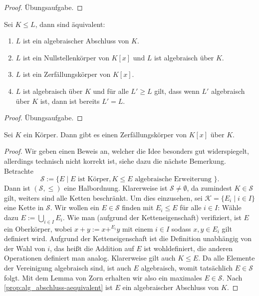 \begin{proof}
    Übungsaufgabe.
\end{proof}

\begin{proposition}\label{prop:alg_abschluss-aequivalent}
    Sei $K \leq L$, dann sind äquivalent:
    \begin{enumerate}
        \item $L$ ist ein algebraischer Abschluss von $K$.
        \item $L$ ist ein Nullstellenkörper von $K[x]$ und $L$ ist algebraisch über $K$.
        \item $L$ ist ein Zerfällungskörper von $K[x]$.
        \item $L$ ist algebraisch über $K$ und für alle $L' \geq L$ gilt, dass wenn $L'$ algebraisch über $K$ ist, dann ist bereits $L' = L$.
    \end{enumerate}
\end{proposition}

\begin{proof}
    Übungsaufgabe.
\end{proof}

\begin{proposition}\label{prop:alg_abschluss}
    Sei $K$ ein Körper. Dann gibt es einen Zerfällungskörper von $K[x]$ über $K$.
\end{proposition}

\begin{proof}
    Wir geben einen Beweis an, welcher die Idee besonders gut widerspiegelt, allerdings technisch nicht korrekt ist, siehe dazu die nächste Bemerkung. Betrachte
    $$ \mathcal{S} := \{ E \mid E \text{ ist Körper}, K \leq E \text{ algebraische Erweiterung } \}. $$
    Dann ist $(\mathcal{S}, \leq)$ eine Halbordnung. Klarerweise ist $\mathcal{S} \neq \emptyset$, da zumindest $K\in \mathcal{S}$ gilt, weiters sind alle Ketten beschränkt. Um dies einzusehen, sei $\mathcal{K} = \{ E_i \mid i \in I \}$ eine Kette in $\mathcal{S}$. Wir wollen ein $E \in \mathcal{S}$ finden mit $E_i \leq E$ für alle $i \in I$: Wähle dazu $E := \bigcup_{i \in I} E_i$. Wie man (aufgrund der Ketteneigenschaft) verifiziert, ist $E$ ein Oberkörper, wobei $x+y:=x+^{E_i}y$ mit einem $i\in I$ sodass $x,y\in E_i$ gilt definiert wird. Aufgrund der Ketteneigenschaft ist die Definition unabhängig von der Wahl von $i$, das heißt die Addition auf $E$ ist wohldefiniert, die anderen Operationen definiert man analog. Klarerweise gilt auch $K \leq E$. Da alle Elemente der Vereinigung algebraisch sind, ist auch $E$ algebraisch, womit tatsächlich $E \in \mathcal{S}$ folgt. Mit dem Lemma von Zorn erhalten wir also ein maximales $E \in \mathcal{S}$. Nach \cref{prop:alg_abschluss-aequivalent} ist $E$ ein algebraischer Abschluss von $K$.
\end{proof}

